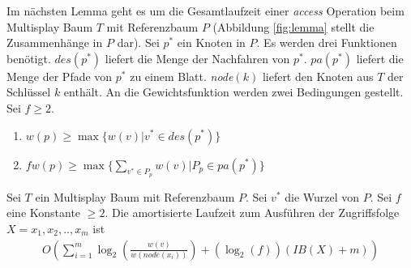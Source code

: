 \documentclass[a4paper,12pt]{article}
\begin{document}
\noindent Im nächsten Lemma geht es um die Gesamtlaufzeit einer \textit{access} Operation beim Multisplay Baum $T$ mit Referenzbaum $P$ (Abbildung \ref{fig:lemma} stellt die Zusammenhänge in $P$ dar). Sei $p^*$ ein Knoten in $P$. Es werden drei Funktionen benötigt. $\mathit{des}\left(p^*\right)$ liefert die Menge der Nachfahren von $p^*$.  $\mathit{pa}\left(p^*\right)$ liefert die Menge der Pfade von $p^*$ zu einem Blatt. \textit{node}$\left(k\right)$ liefert den Knoten aus $T$ der Schlüssel $k$ enthält. An die Gewichtsfunktion werden zwei Bedingungen gestellt. Sei $f \geq 2$.
\begin{enumerate}
	\item $w\left(p\right) \geq \max \{  w\left(v\right)\vert  v^*
	\in\mathit{des}\left(p^*\right)  \}$
	\item $f  w\left(p\right) \geq    \max \{  \sum_{v^* \in P_p }  w\left(v\right)\vert    P_p \in \mathit{pa}\left(p^*\right) \}  $
\end{enumerate}
\begin{Lemma2}
	Sei $T$ ein Multisplay Baum mit Referenzbaum $P$. Sei $v^*$ die Wurzel von $P$. Sei $f$ eine Konstante $\geq 2$. Die amortisierte Laufzeit zum Ausführen der Zugriffsfolge $X = x_1, x_2,..,x_m$ ist 
\begin{align*}
O\left(  \sum_{i = 1}^{m} \log_2\left(   \frac{w\left(v\right)}{w\left(\textit{node}\left(x_i\right)\right)}  \right)  
+ \left(\log_2\left( f\right)\right) \left(\mathit{IB}\left(X\right) + m\right) \right)
\end{align*}
\end{Lemma2}
\end{document}
